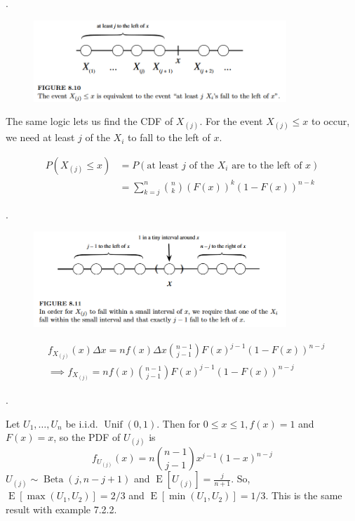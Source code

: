 \documentclass[8pt]{beamer}
\newcommand{\Unif}[2]{\operatorname{Unif}\!\left(#1, #2\right)}
\newcommand{\expec}[1]{\operatorname{E}\left[ #1 \right]}
\newcommand{\Beta}[2]{\operatorname{Beta}\!\left(#1, #2\right)}
\begin{document}
\begin{frame}{.}
    \begin{figure}
        \includegraphics[width=0.85\textwidth]{OrderStatisticsCDF.png}
    \end{figure}
    The same logic lets us find the CDF of $X_{(j)}$. For the event $X_{(j)} \leq x$ to occur, we need at least $j$ of the $X_i$ to fall to the left of $x$.

    \[
    \begin{aligned}
        P(X_{(j)} \leq x) &= P(\text{at least }j \text{ of the }X_i\text{ are to the left of }x) 
        \\
        &=\sum_{k=j}^n \binom{n}{k} (F(x))^k (1-F(x))^{n-k}
    \end{aligned}
    \]
\end{frame}

\begin{frame}{.}
    \begin{figure}
        \includegraphics[width=0.85\textwidth]{OrderStatisticsPDF.png}
    \end{figure}

    \[
    \begin{aligned}
        &f_{X_{(j)}}(x) \Delta x = n f(x) \Delta x  \binom{n-1}{j-1} F(x)^{j-1} (1-F(x))^{n-j} \\
        &\implies f_{X_{(j)}} = n f(x) \binom{n-1}{j-1} F(x)^{j-1} (1-F(x))^{n-j}
    \end{aligned}
    \]
\end{frame}

\begin{frame}{.}
    \begin{example}
        Let $U_1, \dots, U_n$ be i.i.d. $\Unif{0}{1}$. Then for $0 \leq x \leq 1, f(x) = 1$ and $F(x) = x$, so the PDF of $U_{(j)}$ is
        \[
            f_{U_{(j)}}(x) = n \binom{n-1}{j-1} x^{j-1} (1-x)^{n-j}
        \]
        $U_{(j)} \sim \Beta{j}{n-j+1}$ and $\expec{U_{(j)}} = \frac{j}{n+1}$.
        So, $\expec{\max(U_1, U_2)} = 2/3$ and $\expec{\min(U_1, U_2)} = 1/3$. This is the same result with example 7.2.2.
    \end{example}

\end{frame}
\end{document}
